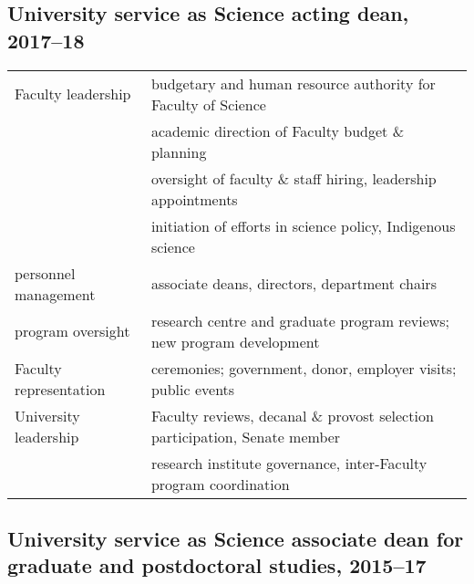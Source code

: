\subsection{University service as Science acting dean, 2017--18}

\begin{tabularx}{\textwidth}{lX}
Faculty leadership & budgetary and human resource authority for Faculty of Science \\
& academic direction of Faculty budget \& planning   \\
& oversight of faculty \& staff hiring, leadership appointments \\
& initiation of efforts in science policy, Indigenous science \\
personnel management & associate deans, directors, department chairs \\
program oversight & research centre and graduate program reviews; new program development \\
Faculty representation & ceremonies; government, donor, employer visits; public events \\
University leadership  &  Faculty reviews, decanal \& provost selection participation, Senate member\\
 & research institute governance, inter-Faculty program coordination\\ 
\end{tabularx}

\subsection{University service as Science associate dean for graduate and postdoctoral studies, 2015--17}

